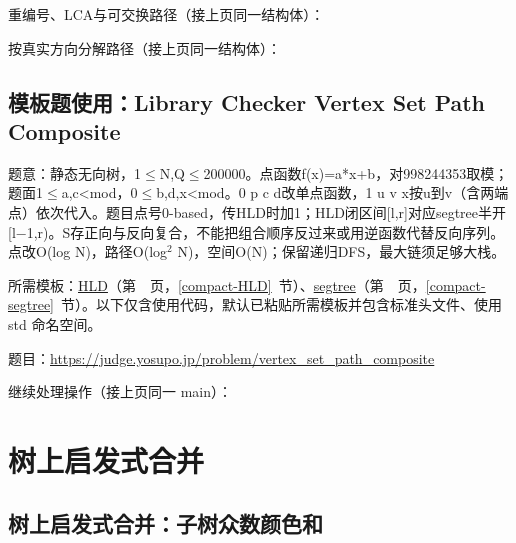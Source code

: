 \Needspace{558pt}



\newpage

\noindent 重编号、LCA与可交换路径（接上页同一结构体）：



\newpage

\noindent 按真实方向分解路径（接上页同一结构体）：



\Needspace{647pt}

\subsection*{模板题使用：Library Checker Vertex Set Path Composite}

\label{usage-example-231}

题意：静态无向树，1$\le$N,Q$\le$200000。点函数f(x)=a*x+b，对998244353取模；题面1$\le$a,c<mod，0$\le$b,d,x<mod。0 p c d改单点函数，1 u v x按u到v（含两端点）依次代入。题目点号0-based，传HLD时加1；HLD闭区间[l,r]对应segtree半开[l−1,r)。S存正向与反向复合，不能把组合顺序反过来或用逆函数代替反向序列。点改O(log N)，路径O(log$^{2}$ N)，空间O(N)；保留递归DFS，最大链须足够大栈。

所需模板：\hyperref[compact-HLD]{HLD}（第~\pageref{compact-HLD}~页，\ref{compact-HLD}~节）、\hyperref[compact-segtree]{segtree}（第~\pageref{compact-segtree}~页，\ref{compact-segtree}~节）。以下仅含使用代码，默认已粘贴所需模板并包含标准头文件、使用 std 命名空间。

题目：\url{https://judge.yosupo.jp/problem/vertex_set_path_composite}



\newpage

\noindent 继续处理操作（接上页同一 main）：



\Needspace{180pt}

\section{树上启发式合并}

\subsection{树上启发式合并：子树众数颜色和}\label{compact-SubtreeColors}

